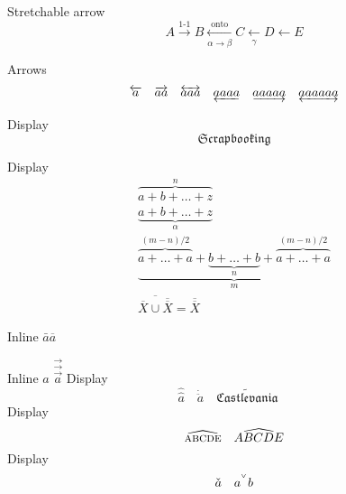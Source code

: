 \documentclass{amsart}
\begin{document}
Stretchable arrow
\[
    A \xrightarrow{\text{1-1}} B \xleftarrow[\alpha \to \beta]{\text{onto}}
    C \xleftarrow[\gamma]{} D \xleftarrow{} E
\]

Arrows
\begin{gather*}
    \overleftarrow a \quad \overrightarrow{aa} \quad
    \overleftrightarrow{aaa} \quad \underleftarrow{aaaa} \quad
    \underrightarrow{aaaaa} \quad \underleftrightarrow{aaaaaa}
\end{gather*}

Display
\[
    \mathfrak{Scrapbooking}
\]

Display
\begin{align*}
    \overbrace{a + b + \dots + z}^n\\
    \underbrace{a+b+\dots+z}_\alpha\\
    \underbrace{
        \overbrace{a+\dots+a}^{(m-n)/2}
        + \underbrace{b + \dots + b}_n
        + \overbrace{a + \dots + a}^{(m-n)/2}
    }_m\\
    \overline{\overline X \cup \overline{\overline X}} = \overline{\overline X}
\end{align*}

Inline $\bar a \overline a$

Inline $\hat{\hat a}$ $\vec{\vec{\vec a}}$
Display
\[
    \hat{\hat a} \quad \dot{\ddot a} \quad
    \widetilde{\mathfrak{Castlevania}} \quad
\]
Display
\[
    \widehat{\text{\scshape abcde}} \quad
    \widehat{ABCDE}
\]
Display
\[
    \check a \quad a^{\spcheck}b
\]
\end{document}
